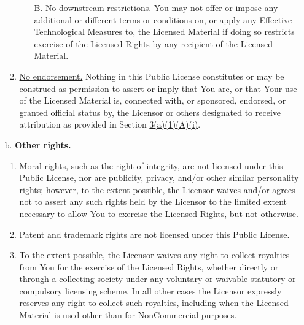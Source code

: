 \begin{itemize}
\begin{enumerate}
\begin{enumerate}
		\item[B.] \underline{No downstream restrictions.} You may not offer or impose any additional or different terms or conditions on, or apply any Effective Technological Measures to, the Licensed Material if doing so restricts exercise of the Licensed Rights by any recipient of the Licensed Material.
		\end{enumerate}
\item \underline{No endorsement.} Nothing in this Public License constitutes or may be construed as permission to assert or imply that You are, or that Your use of the Licensed Material is, connected with, or sponsored, endorsed, or granted official status by, the Licensor or others designated to receive attribution as provided in Section \href{https://creativecommons.org/licenses/by-nc-nd/4.0/legalcode#s3a1Ai}{3(a)(1)(A)(i)}.
	\end{enumerate}
\item[b.] \textbf{Other rights.}
	\begin{enumerate}
	\item Moral rights, such as the right of integrity, are not licensed under this Public License, nor are publicity, privacy, and/or other similar personality rights; however, to the extent possible, the Licensor waives and/or agrees not to assert any such rights held by the Licensor to the limited extent necessary to allow You to exercise the Licensed Rights, but not otherwise.
	\item Patent and trademark rights are not licensed under this Public License.
	\item To the extent possible, the Licensor waives any right to collect royalties from You for the exercise of the Licensed Rights, whether directly or through a collecting society under any voluntary or waivable statutory or compulsory licensing scheme. In all other cases the Licensor expressly reserves any right to collect such royalties, including when the Licensed Material is used other than for NonCommercial purposes.
	\end{enumerate}
\end{itemize}

